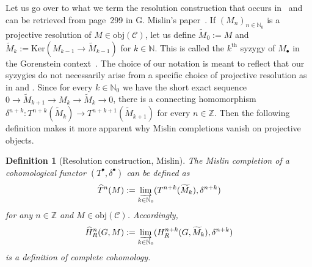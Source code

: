 \documentclass[12pt,a4paper]{article}
\numberwithin{equation}{section}
\newtheorem{defn}[thm]{Definition}
\theoremstyle{nonumberplain}
\begin{document}
Let us go over to what we term the resolution construction that occurs in~\cite[Lemma~B.3]{cel17} and can be retrieved from page~299 in G.\! Mislin's paper~\cite{mis94}. If $(M_n)_{n \in \mathbb{N}_0}$ is a projective resolution of $M \in \mathrm{obj}(\mathcal{C})$, let us define $\widetilde{M}_0 := M$ and $\widetilde{M}_k := \mathrm{Ker}(M_{k-1} \rightarrow \widetilde{M}_{k-1})$ for $k \in \mathbb{N}$. This is called the $k^{\text{th}}$ syzygy of $M_{\bullet}$ in the Gorenstein context~\cite[p.~89]{pag16}. The choice of our notation is meant to reflect that our syzygies do not necessarily arise from a specific choice of projective resolution as in \cite{kro95} and \cite{mis94}. Since for every $k \in \mathbb{N}_0$ we have the short exact sequence $0 \rightarrow \widetilde{M}_{k+1} \rightarrow M_k \rightarrow \widetilde{M}_k \rightarrow 0$, there is a connecting homomorphism $\delta^{n+k}: T^{n+k}(\widetilde{M}_k) \rightarrow T^{n+k+1}(\widetilde{M}_{k+1})$ for every $n \in \mathbb{Z}$. Then the following definition makes it more apparent why Mislin completions vanish on projective objects.

\begin{defn}[Resolution construction, Mislin]\label{defn:resolsinoutline}
The Mislin completion of a cohomological functor $(T^{\bullet}, \delta^{\bullet})$ can be defined as 
\[ \widehat{T}^n(M) := \varinjlim_{k \in \mathbb{N}_0} (T^{n+k}(\widetilde{M}_k), \delta^{n+k}) \]
for any $n \in \mathbb{Z}$ and $M \in \mathrm{obj}(\mathcal{C})$. Accordingly,
\[ \widehat{H}_R^n(G, M) := \varinjlim_{k \in \mathbb{N}_0} (H_R^{n+k}(G, \widetilde{M}_k), \delta^{n+k}) \]
is a definition of complete cohomology.
\end{defn}
\end{document}
